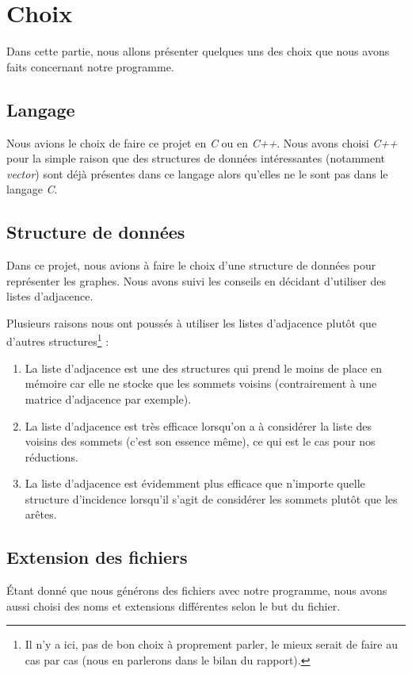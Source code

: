  \section{Choix}
 Dans cette partie, nous allons présenter quelques uns des choix que
 nous avons faits concernant notre programme.

  \subsection{Langage}
  Nous avions le choix de faire ce projet en \emph{C} ou en
  \emph{C++}. Nous avons choisi \emph{C++} pour la simple raison que des
  structures de données intéressantes (notamment \emph{vector}) sont
  déjà présentes dans ce langage alors qu'elles ne le sont pas dans le
  langage \emph{C}.
  
  \subsection{Structure de données}
  Dans ce projet, nous avions à faire le choix d'une structure de
  données pour représenter les graphes. Nous avons suivi les conseils en
  décidant d'utiliser des listes d'adjacence.

  Plusieurs raisons nous ont poussés à utiliser les listes d'adjacence
  plutôt que d'autres structures\footnote{Il n'y a ici, pas de bon choix
  à proprement parler, le mieux serait de faire au cas par cas (nous en
  parlerons dans le bilan du rapport).} :
  \begin{enumerate}
   \item La liste d'adjacence est une des structures qui prend le moins
	 de place en mémoire car elle ne stocke que les sommets voisins
	 (contrairement à une matrice d'adjacence par exemple).
   \item La liste d'adjacence est très efficace lorsqu'on a à
	 considérer la liste des voisins des sommets (c'est son essence
	 même), ce qui est le cas pour nos réductions.
   \item La liste d'adjacence est évidemment plus efficace que n'importe
	 quelle structure d'incidence lorsqu'il s'agit de considérer les
	 sommets plutôt que les arêtes.
  \end{enumerate}

  

  \subsection{Extension des fichiers}
  Étant donné que nous générons des fichiers avec notre programme, nous
  avons aussi choisi des noms et extensions différentes selon le but du
  fichier.

